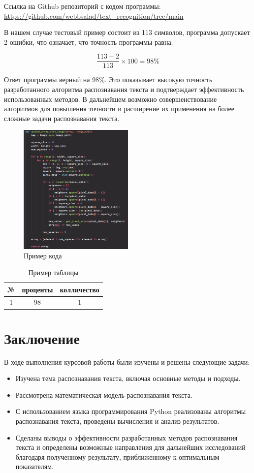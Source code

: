 \documentclass[14pt]{extreport}
\begin{document}
Ссылка на Github репозиторий с кодом программы: \url{https://github.com/webbsalad/text_recognition/tree/main}


В нашем случае тестовый пример состоит из 113 символов, программа допускает 2 ошибки, что означает, что точность программы равна:

\[
\frac{113 - 2}{113} \times 100 = 98\%
\]

Ответ программы верный на 98\%. Это показывает высокую точность разработанного алгоритма распознавания текста и подтверждает эффективность использованных методов. В дальнейшем возможно совершенствование алгоритмов для повышения точности и расширение их применения на более сложные задачи распознавания текста.

\begin{figure}[h]
\centering
\includegraphics[width=0.5\textwidth]{photos/image1.png}
\caption{Пример кода}
\label{fig:example}
\end{figure}


\begin{table}[h]
\centering
\begin{tabular}{|c|c|c|}
\hline
№ & проценты & колличество \\
\hline
1 & 98 & 1 \\
\hline
\end{tabular}
\caption{Пример таблицы}
\label{tab:example}
\end{table}

\chapter*{Заключение}

В ходе выполнения курсовой работы были изучены и решены следующие задачи:
\begin{itemize}
    \item Изучена тема распознавания текста, включая основные методы и подходы.
    \item Рассмотрена математическая модель распознавания текста.
    \item С использованием языка программирования Python реализованы алгоритмы распознавания текста, проведены вычисления и анализ результатов.
    \item Сделаны выводы о эффективности разработанных методов распознавания текста и определены возможные направления для дальнейших исследований благодаря полученному результату, приближенному к оптимальным показателям.
\end{itemize}
\end{document}

